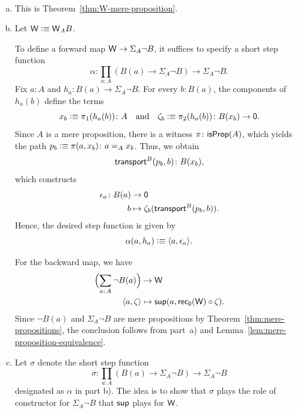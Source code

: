\begin{solution}\ 
    \begin{enumerate}[a)]
        \item This is Theorem~\ref{thm:W-mere-proposition}.

        \item Let $\mathsf{W}\mathrel{\vcentcolon}\equiv\mathsf{W}_AB$. 

        To define a forward map $\mathsf{W}\to\Sigma_A\neg B$, it suffices to specify a short step function
        \[
            \alpha\colon\prod_{a\colon A}
                (B(a)\to\Sigma_A\neg B)\to\Sigma_A\neg B.
        \]
        Fix $a\colon A$ and $h_a\colon B(a)\to\Sigma_A\neg B$. For every $b\colon B(a)$, the components of $h_a(b)$ define the terms
        \[
            x_b\defeq\pi_1(h_a(b))\colon A
            \quad\text{and}\quad
            \zeta_b\defeq\pi_2(h_a(b))\colon B(x_b)\to\fun0.
        \]
        Since $A$ is a mere proposition, there is a witness $\pi\colon\fun{isProp}(A)$, which yields the path $p_b\defeq\pi(a,x_b)\colon a\eq{A}x_b$. Thus, we obtain
        \[
            \fun{transport}^B(p_b,b)\colon B(x_b),
        \]
        which constructs
        \begin{align*}
            \epsilon_a\colon B(a)&\to\fun0\\
            b&\mapsto\zeta_b(\fun{transport}^B(p_b,b)).
        \end{align*}
        Hence, the desired step function is given by
        \[
            \alpha(a,h_a)\mathrel{\vcentcolon}\equiv\langle a,\epsilon_a\rangle.
        \]
        
        For the backward map, we have
        \begin{align*}
            \Bigl(
                \sum_{a\colon A}\neg B(a)
            \Bigr)
                &\to\fun W\\
            \dep{a,\zeta}
                &\mapsto
                    \fun{sup}
                        (
                            a,
                            \fun{rec}_{\fun0}(\fun W)\circ\zeta
                        ).
        \end{align*}
        Since $\neg B(a)$ and $\Sigma_A\neg B$ are mere propositions by Theorem~\ref{thm:mere-propositions}, the conclusion follows from part~a) and Lemma~\ref{lem:mere-proposition-equivalence}.

        \item Let $\sigma$ denote the short step function
        \[
            \sigma\colon
                \prod_{a\colon A}(B(a)\to\Sigma_A\neg B)
                \to\Sigma_A\neg B
        \]
        designated as $\alpha$ in part b). The idea is to show that $\sigma$ plays the role of constructor for $\Sigma_A\neg B$ that $\mathsf{sup}$ plays for $\mathsf{W}$.
        

\end{enumerate}
\end{solution}
